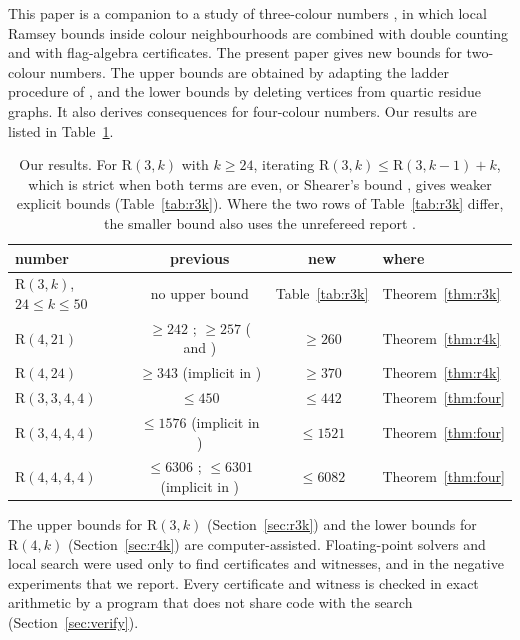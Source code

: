 \documentclass[11pt]{article}
\theoremstyle{spacedplain}
\theoremstyle{spaceddef}
\theoremstyle{spacedremark}
\newcommand{\R}{\mathrm{R}}
\begin{document}
This paper is a companion to a study of three-colour numbers \cite{DC26}, in which local Ramsey bounds inside colour neighbourhoods are combined with double counting and with flag-algebra certificates.
The present paper gives new bounds for two-colour numbers.
The upper bounds are obtained by adapting the ladder procedure of \cite[Section~5]{DC26}, and the lower bounds by deleting vertices from quartic residue graphs.
It also derives consequences for four-colour numbers.
Our results are listed in Table~\ref{tab:results}.

\begin{table}[htbp]
\centering
\begin{tabular}{lccl}
\toprule
number & previous & new & where\\
\midrule
$\R(3,k)$, $24\le k\le 50$ & no upper bound \cite{Rad26} & Table~\ref{tab:r3k} & Theorem~\ref{thm:r3k}\\
$\R(4,21)$ & $\ge 242$ \cite{SLZL}; $\ge 257$ (\cite{Yu26} and \cite[2.3(e)]{Rad26}) & $\ge 260$ & Theorem~\ref{thm:r4k}\\
$\R(4,24)$ & $\ge 343$ (implicit in \cite{LinCa}) & $\ge 370$ & Theorem~\ref{thm:r4k}\\
$\R(3,3,4,4)$ & $\le 450$ \cite{Rad26} & $\le 442$ & Theorem~\ref{thm:four}\\
$\R(3,4,4,4)$ & $\le 1576$ \cite{Rad26} (implicit in \cite{Boz26}) & $\le 1521$ & Theorem~\ref{thm:four}\\
$\R(4,4,4,4)$ & $\le 6306$ \cite{Rad26}; $\le 6301$ (implicit in \cite{Boz26}) & $\le 6082$ & Theorem~\ref{thm:four}\\
\bottomrule
\end{tabular}
\caption{Our results.
For $\R(3,k)$ with $k\ge 24$, iterating $\R(3,k)\le\R(3,k-1)+k$, which is strict when both terms are even, or Shearer's bound \cite{Sh83}, gives weaker explicit bounds (Table~\ref{tab:r3k}).
Where the two rows of Table~\ref{tab:r3k} differ, the smaller bound also uses the unrefereed report \cite{Back3}.}
\label{tab:results}
\end{table}

The upper bounds for $\R(3,k)$ (Section~\ref{sec:r3k}) and the lower bounds for $\R(4,k)$ (Section~\ref{sec:r4k}) are computer-assisted.
Floating-point solvers and local search were used only to find certificates and witnesses, and in the negative experiments that we report.
Every certificate and witness is checked in exact arithmetic by a program that does not share code with the search (Section~\ref{sec:verify}).
\end{document}
